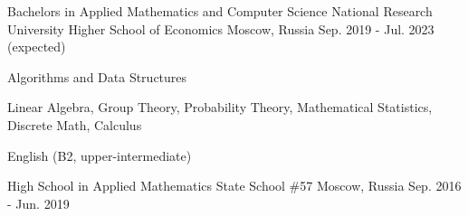 

\begin{cventries}

  \cventry
    {Bachelors in Applied Mathematics and Computer Science} %
    {National Research University Higher School of Economics} %
    {Moscow, Russia} %
    {Sep. 2019 - Jul. 2023 (expected)} %
    {
      \begin{cvitems} %
        \item {Algorithms and Data Structures}
        \item {Linear Algebra, Group Theory, Probability Theory, Mathematical Statistics, Discrete Math, Calculus}
        \item {English (B2, upper-intermediate)}
      \end{cvitems}
    }

 \cventry
    {High School in Applied Mathematics} %
    {State School \#57} %
    {Moscow, Russia} %
    {Sep. 2016 - Jun. 2019} %
    {
    }
\end{cventries}
